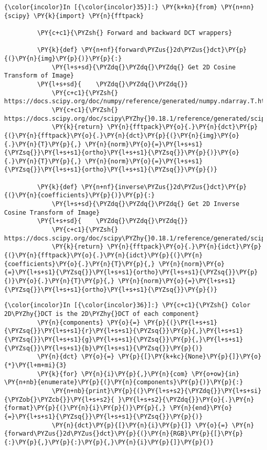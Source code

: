     \begin{Verbatim}[commandchars=\\\{\}]
{\color{incolor}In [{\color{incolor}35}]:} \PY{k+kn}{from} \PY{n+nn}{scipy} \PY{k}{import} \PY{n}{fftpack}
         
         \PY{c+c1}{\PYZsh{} Forward and backward DCT wrappers}
         
         \PY{k}{def} \PY{n+nf}{forward\PYZus{}2d\PYZus{}dct}\PY{p}{(}\PY{n}{img}\PY{p}{)}\PY{p}{:}
             \PY{l+s+sd}{\PYZdq{}\PYZdq{}\PYZdq{} Get 2D Cosine Transform of Image}
         \PY{l+s+sd}{    \PYZdq{}\PYZdq{}\PYZdq{}}
             \PY{c+c1}{\PYZsh{} https://docs.scipy.org/doc/numpy/reference/generated/numpy.ndarray.T.html\PYZsh{}numpy.ndarray.T}
             \PY{c+c1}{\PYZsh{} https://docs.scipy.org/doc/scipy\PYZhy{}0.18.1/reference/generated/scipy.fftpack.dct.html}
             \PY{k}{return} \PY{n}{fftpack}\PY{o}{.}\PY{n}{dct}\PY{p}{(}\PY{n}{fftpack}\PY{o}{.}\PY{n}{dct}\PY{p}{(}\PY{n}{img}\PY{o}{.}\PY{n}{T}\PY{p}{,} \PY{n}{norm}\PY{o}{=}\PY{l+s+s1}{\PYZsq{}}\PY{l+s+s1}{ortho}\PY{l+s+s1}{\PYZsq{}}\PY{p}{)}\PY{o}{.}\PY{n}{T}\PY{p}{,} \PY{n}{norm}\PY{o}{=}\PY{l+s+s1}{\PYZsq{}}\PY{l+s+s1}{ortho}\PY{l+s+s1}{\PYZsq{}}\PY{p}{)}
         
         \PY{k}{def} \PY{n+nf}{inverse\PYZus{}2d\PYZus{}dct}\PY{p}{(}\PY{n}{coefficients}\PY{p}{)}\PY{p}{:}
             \PY{l+s+sd}{\PYZdq{}\PYZdq{}\PYZdq{} Get 2D Inverse Cosine Transform of Image}
         \PY{l+s+sd}{    \PYZdq{}\PYZdq{}\PYZdq{}}
             \PY{c+c1}{\PYZsh{} https://docs.scipy.org/doc/scipy\PYZhy{}0.18.1/reference/generated/scipy.fftpack.idct.html}
             \PY{k}{return} \PY{n}{fftpack}\PY{o}{.}\PY{n}{idct}\PY{p}{(}\PY{n}{fftpack}\PY{o}{.}\PY{n}{idct}\PY{p}{(}\PY{n}{coefficients}\PY{o}{.}\PY{n}{T}\PY{p}{,} \PY{n}{norm}\PY{o}{=}\PY{l+s+s1}{\PYZsq{}}\PY{l+s+s1}{ortho}\PY{l+s+s1}{\PYZsq{}}\PY{p}{)}\PY{o}{.}\PY{n}{T}\PY{p}{,} \PY{n}{norm}\PY{o}{=}\PY{l+s+s1}{\PYZsq{}}\PY{l+s+s1}{ortho}\PY{l+s+s1}{\PYZsq{}}\PY{p}{)}
\end{Verbatim}


    \begin{Verbatim}[commandchars=\\\{\}]
{\color{incolor}In [{\color{incolor}36}]:} \PY{c+c1}{\PYZsh{} Color 2D\PYZhy{}DCT is the 2D\PYZhy{}DCT of each component}
         \PY{n}{components} \PY{o}{=} \PY{p}{(}\PY{l+s+s1}{\PYZsq{}}\PY{l+s+s1}{r}\PY{l+s+s1}{\PYZsq{}}\PY{p}{,}\PY{l+s+s1}{\PYZsq{}}\PY{l+s+s1}{g}\PY{l+s+s1}{\PYZsq{}}\PY{p}{,}\PY{l+s+s1}{\PYZsq{}}\PY{l+s+s1}{b}\PY{l+s+s1}{\PYZsq{}}\PY{p}{)}
         \PY{n}{dct} \PY{o}{=} \PY{p}{[}\PY{k+kc}{None}\PY{p}{]}\PY{o}{*}\PY{l+m+mi}{3}
         \PY{k}{for} \PY{n}{i}\PY{p}{,}\PY{n}{com} \PY{o+ow}{in} \PY{n+nb}{enumerate}\PY{p}{(}\PY{n}{components}\PY{p}{)}\PY{p}{:}
             \PY{n+nb}{print}\PY{p}{(}\PY{l+s+s2}{\PYZdq{}}\PY{l+s+si}{\PYZob{}\PYZcb{}}\PY{l+s+s2}{ }\PY{l+s+s2}{\PYZdq{}}\PY{o}{.}\PY{n}{format}\PY{p}{(}\PY{n}{i}\PY{p}{)}\PY{p}{,} \PY{n}{end}\PY{o}{=}\PY{l+s+s1}{\PYZsq{}}\PY{l+s+s1}{\PYZsq{}}\PY{p}{)}
             \PY{n}{dct}\PY{p}{[}\PY{n}{i}\PY{p}{]} \PY{o}{=} \PY{n}{forward\PYZus{}2d\PYZus{}dct}\PY{p}{(}\PY{n}{RGB}\PY{p}{[}\PY{p}{:}\PY{p}{,}\PY{p}{:}\PY{p}{,}\PY{n}{i}\PY{p}{]}\PY{p}{)}
\end{Verbatim}


